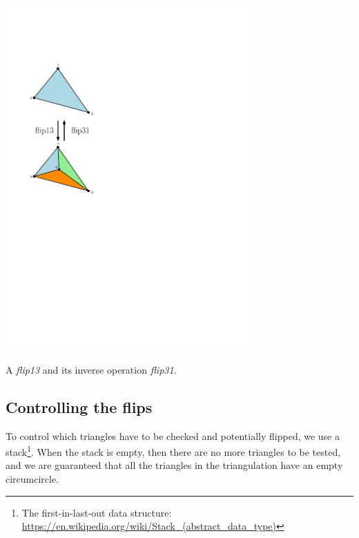 \begin{marginfigure}
  \centering
  \includegraphics[width=0.7\textwidth]{figs/flip13}
  \caption{A \emph{flip13} and its inverse operation \emph{flip31}.}%
\label{fig:flip13}
\end{marginfigure}


\subsection{Controlling the flips}
To control which triangles have to be checked and potentially flipped, we use a stack\footnote{The first-in-last-out data structure: \url{https://en.wikipedia.org/wiki/Stack_(abstract_data_type)}}. 
When the stack is empty, then there are no more triangles to be tested, and we are guaranteed that all the triangles in the triangulation have an empty circumcircle.


